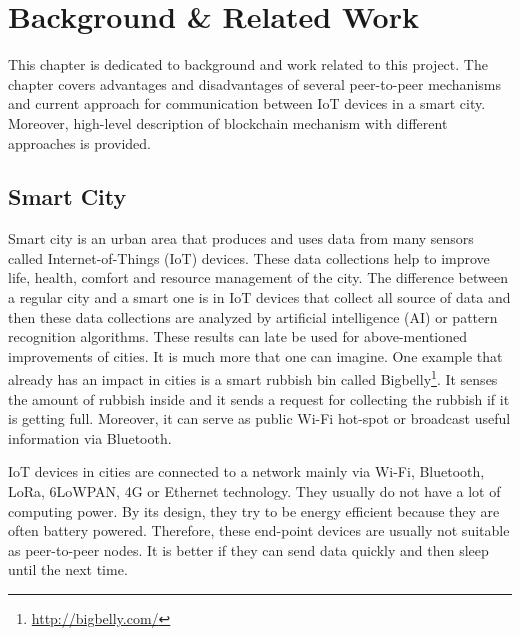 \chapter{Background \& Related Work\label{chap:literature-review}}
This chapter is dedicated to background and work related to this project. The chapter covers advantages and disadvantages of several peer-to-peer mechanisms and current approach for communication between IoT devices in a smart city. Moreover, high-level description of blockchain mechanism with different approaches is provided.

\section{Smart City}
\quad Smart city is an urban area that produces and uses data from many sensors called Internet-of-Things (IoT) devices. These data collections help to improve life, health, comfort and resource management of the city. The difference between a regular city and a smart one is in IoT devices that collect all source of data and then these data collections are analyzed by artificial intelligence (AI) or pattern recognition algorithms. These results can late be used for above-mentioned improvements of cities. It is much more that one can imagine. One example that already has an impact in cities is a smart rubbish bin called Bigbelly\footnote{\url{http://bigbelly.com/}}. It senses the amount of rubbish inside and it sends a request for collecting the rubbish if it is getting full. Moreover, it can serve as public Wi-Fi hot-spot or broadcast useful information via Bluetooth.

IoT devices in cities are connected to a network mainly via Wi-Fi, Bluetooth, LoRa, 6LoWPAN, 4G or Ethernet technology. They usually do not have a lot of computing power. By its design, they try to be energy efficient because they are often battery powered. Therefore, these end-point devices are usually not suitable as peer-to-peer nodes. It is better if they can send data quickly and then sleep until the next time.

